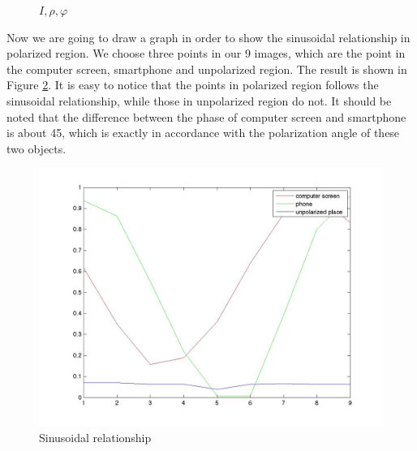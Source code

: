 \documentclass[english]{article}
\begin{document}
\begin{figure}[H]
	\centering
	\caption{$I, \rho, \varphi$}
	\label{fig:five}
\end{figure}

Now we are going to draw a graph in order to show the sinusoidal relationship in polarized region. We choose three points in our 9 images, which are the point in the computer screen, smartphone and unpolarized region. The result is shown in Figure \ref{fig:plot}. It is easy to notice that the points in polarized region follows the sinusoidal relationship, while those in unpolarized region do not. It should be noted that the difference between the phase of computer screen and smartphone is about 45\textdegree, which is exactly in accordance with the polarization angle of these two objects.
 \begin{figure}[H]
 	\centering
	\includegraphics[width=\linewidth]{Pictures/Least_Mean/sin.jpg}
 	\caption{Sinusoidal relationship }
 	\label{fig:plot}
 \end{figure}
\end{document}
